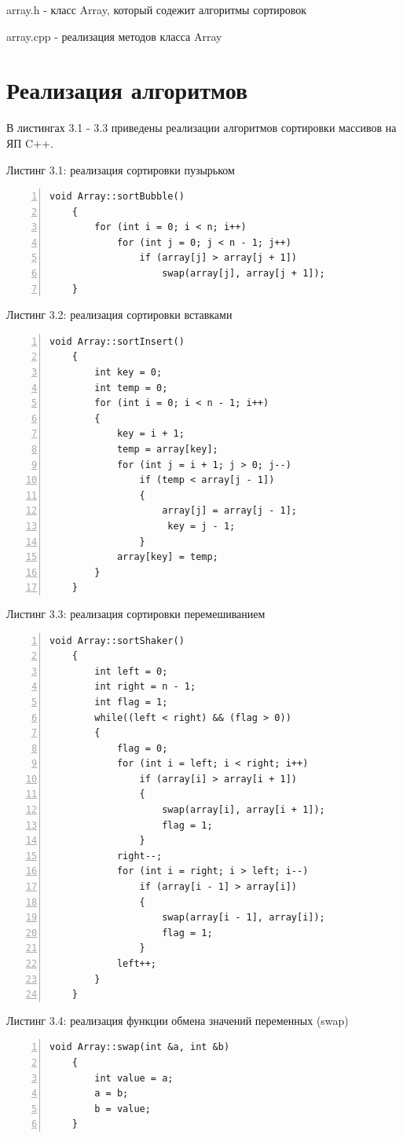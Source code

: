 \documentclass[12pt,a4paper]{report}
\begin{document}
array.h - класс Array, который содежит алгоритмы сортировок

array.cpp - реализация методов класса Array

\section{Реализация алгоритмов}

В листингах 3.1 - 3.3 приведены реализации алгоритмов
сортировки массивов на ЯП C++.

\noindent\textrm{Листинг 3.1: реализация сортировки пузырьком}
\begin{lstlisting}[frame=single, numbers=left]
    void Array::sortBubble()
    {
        for (int i = 0; i < n; i++)
            for (int j = 0; j < n - 1; j++)
                if (array[j] > array[j + 1])
                    swap(array[j], array[j + 1]);
    }
\end{lstlisting}

\noindent\textrm{Листинг 3.2: реализация сортировки вставками}
\begin{lstlisting}[frame=single, numbers=left]
    void Array::sortInsert()
    {
        int key = 0;
        int temp = 0;
        for (int i = 0; i < n - 1; i++)
        {
            key = i + 1;
            temp = array[key];
            for (int j = i + 1; j > 0; j--)
                if (temp < array[j - 1])
                {
                    array[j] = array[j - 1];
                     key = j - 1;
                }
            array[key] = temp;
        }
    }
\end{lstlisting}

\noindent\textrm{Листинг 3.3: реализация сортировки перемешиванием}
\begin{lstlisting}[frame=single, numbers=left]
    void Array::sortShaker()
    {
        int left = 0;
        int right = n - 1;
        int flag = 1;
        while((left < right) && (flag > 0))
        {
            flag = 0;
            for (int i = left; i < right; i++)
                if (array[i] > array[i + 1])
                {
                    swap(array[i], array[i + 1]);
                    flag = 1;
                }
            right--;
            for (int i = right; i > left; i--)
                if (array[i - 1] > array[i])
                {
                    swap(array[i - 1], array[i]);
                    flag = 1;
                }
            left++;
        }
    }
\end{lstlisting}

\noindent\textrm{Листинг 3.4: реализация функции обмена значений переменных (swap)}
\begin{lstlisting}[frame=single, numbers=left]
	void Array::swap(int &a, int &b)
	{
		int value = a;
		a = b;
		b = value;
	}
\end{lstlisting}
\end{document}
